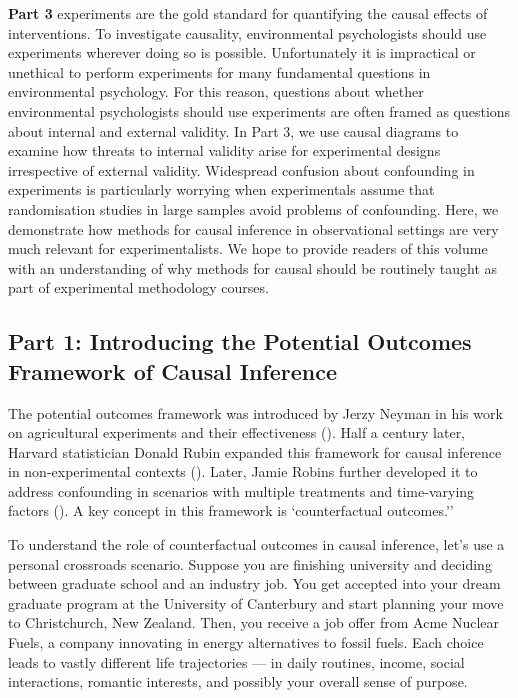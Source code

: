 \documentclass[
  singlecolumn]{article}
\begin{document}
\textbf{Part 3} experiments are the gold standard for quantifying the
causal effects of interventions. To investigate causality, environmental
psychologists should use experiments wherever doing so is possible.
Unfortunately it is impractical or unethical to perform experiments for
many fundamental questions in environmental psychology. For this reason,
questions about whether environmental psychologists should use
experiments are often framed as questions about internal and external
validity. In Part 3, we use causal diagrams to examine how threats to
internal validity arise for experimental designs irrespective of
external validity. Widespread confusion about confounding in experiments
is particularly worrying when experimentals assume that randomisation
studies in large samples avoid problems of confounding. Here, we
demonstrate how methods for causal inference in observational settings
are very much relevant for experimentalists. We hope to provide readers
of this volume with an understanding of why methods for causal should be
routinely taught as part of experimental methodology courses.

\subsection{Part 1: Introducing the Potential Outcomes Framework of
Causal
Inference}\label{part-1-introducing-the-potential-outcomes-framework-of-causal-inference}

The potential outcomes framework was introduced by Jerzy Neyman in his
work on agricultural experiments and their effectiveness
(). Half a century later, Harvard
statistician Donald Rubin expanded this framework for causal inference
in non-experimental contexts ().
Later, Jamie Robins further developed it to address confounding in
scenarios with multiple treatments and time-varying factors
(). A key concept in this
framework is `counterfactual outcomes.''

To understand the role of counterfactual outcomes in causal inference,
let's use a personal crossroads scenario. Suppose you are finishing
university and deciding between graduate school and an industry job. You
get accepted into your dream graduate program at the University of
Canterbury and start planning your move to Christchurch, New Zealand.
Then, you receive a job offer from Acme Nuclear Fuels, a company
innovating in energy alternatives to fossil fuels. Each choice leads to
vastly different life trajectories --- in daily routines, income, social
interactions, romantic interests, and possibly your overall sense of
purpose.
\end{document}
